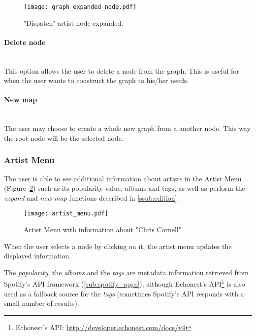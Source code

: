       \begin{figure}[tb]
         \begin{center}
           \texttt{[image: graph\_expanded\_node.pdf]}
         \end{center}
         \caption{"Dispatch" artist node expanded.}
         \label{fig:node_expanded}
      \end{figure}

      \paragraph{Delete node} \hfill \\
      This option allows the user to delete a node from the graph.
      This is useful for when the user wants to construct the graph to his/her needs.

      \paragraph{New map} \hfill \\
      The user may choose to create a whole new graph from a another node.
      This way the root node will be the selected node.



    \subsubsection{Artist Menu} %
      \label{ssub:artist_info}
      The user is able to see additional information about artists in the Artist Menu (Figure~\ref{fig:artist_menu}) such as its popularity value, albums and tags, as well as perform the \emph{expand} and \emph{new map} functions described in \ref{ssub:edition}.
      \begin{figure}[tb]
        \begin{center}
          \texttt{[image: artist\_menu.pdf]}
        \end{center}
        \caption{Artist Menu with information about "Chris Cornell"}
        \label{fig:artist_menu}
      \end{figure}
      When the user selects a node by clicking on it, the artist menu updates the displayed information.

      The \emph{popularity}, the \emph{albums} and the \emph{tags} are metadata information retrieved from Spotify's API framework (\ref{sub:spotify_apps}), although Echonest's API\footnote{Echonest's API: \url{http://developer.echonest.com/docs/v4}} is also used as a fallback source for the \emph{tags} (sometimes Spotify's API responds with a small number of results).

